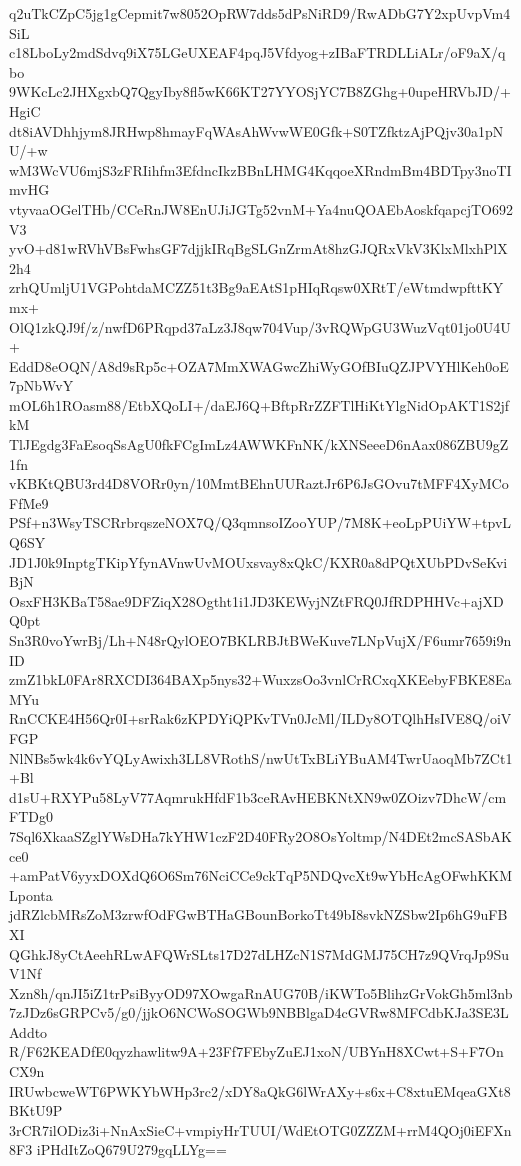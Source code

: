q2uTkCZpC5jg1gCepmit7w8052OpRW7dds5dPsNiRD9/RwADbG7Y2xpUvpVm4SiL
c18LboLy2mdSdvq9iX75LGeUXEAF4pqJ5Vfdyog+zIBaFTRDLLiALr/oF9aX/qbo
9WKcLc2JHXgxbQ7QgyIby8fl5wK66KT27YYOSjYC7B8ZGhg+0upeHRVbJD/+HgiC
dt8iAVDhhjym8JRHwp8hmayFqWAsAhWvwWE0Gfk+S0TZfktzAjPQjv30a1pNU/+w
wM3WcVU6mjS3zFRIihfm3EfdncIkzBBnLHMG4KqqoeXRndmBm4BDTpy3noTImvHG
vtyvaaOGelTHb/CCeRnJW8EnUJiJGTg52vnM+Ya4nuQOAEbAoskfqapcjTO692V3
yvO+d81wRVhVBsFwhsGF7djjkIRqBgSLGnZrmAt8hzGJQRxVkV3KlxMlxhPlX2h4
zrhQUmljU1VGPohtdaMCZZ51t3Bg9aEAtS1pHIqRqsw0XRtT/eWtmdwpfttKYmx+
OlQ1zkQJ9f/z/nwfD6PRqpd37aLz3J8qw704Vup/3vRQWpGU3WuzVqt01jo0U4U+
EddD8eOQN/A8d9sRp5c+OZA7MmXWAGwcZhiWyGOfBIuQZJPVYHlKeh0oE7pNbWvY
mOL6h1ROasm88/EtbXQoLI+/daEJ6Q+BftpRrZZFTlHiKtYlgNidOpAKT1S2jfkM
TlJEgdg3FaEsoqSsAgU0fkFCgImLz4AWWKFnNK/kXNSeeeD6nAax086ZBU9gZ1fn
vKBKtQBU3rd4D8VORr0yn/10MmtBEhnUURaztJr6P6JsGOvu7tMFF4XyMCoFfMe9
PSf+n3WsyTSCRrbrqszeNOX7Q/Q3qmnsoIZooYUP/7M8K+eoLpPUiYW+tpvLQ6SY
JD1J0k9InptgTKipYfynAVnwUvMOUxsvay8xQkC/KXR0a8dPQtXUbPDvSeKviBjN
OsxFH3KBaT58ae9DFZiqX28Ogtht1i1JD3KEWyjNZtFRQ0JfRDPHHVc+ajXDQ0pt
Sn3R0voYwrBj/Lh+N48rQylOEO7BKLRBJtBWeKuve7LNpVujX/F6umr7659i9nID
zmZ1bkL0FAr8RXCDI364BAXp5nys32+WuxzsOo3vnlCrRCxqXKEebyFBKE8EaMYu
RnCCKE4H56Qr0I+srRak6zKPDYiQPKvTVn0JcMl/ILDy8OTQlhHsIVE8Q/oiVFGP
NlNBs5wk4k6vYQLyAwixh3LL8VRothS/nwUtTxBLiYBuAM4TwrUaoqMb7ZCt1+Bl
d1sU+RXYPu58LyV77AqmrukHfdF1b3ceRAvHEBKNtXN9w0ZOizv7DhcW/cmFTDg0
7Sql6XkaaSZglYWsDHa7kYHW1czF2D40FRy2O8OsYoltmp/N4DEt2mcSASbAKce0
+amPatV6yyxDOXdQ6O6Sm76NciCCe9ckTqP5NDQvcXt9wYbHcAgOFwhKKMLponta
jdRZlcbMRsZoM3zrwfOdFGwBTHaGBounBorkoTt49bI8svkNZSbw2Ip6hG9uFBXI
QGhkJ8yCtAeehRLwAFQWrSLts17D27dLHZcN1S7MdGMJ75CH7z9QVrqJp9SuV1Nf
Xzn8h/qnJI5iZ1trPsiByyOD97XOwgaRnAUG70B/iKWTo5BlihzGrVokGh5ml3nb
7zJDz6sGRPCv5/g0/jjkO6NCWoSOGWb9NBBlgaD4cGVRw8MFCdbKJa3SE3LAddto
R/F62KEADfE0qyzhawlitw9A+23Ff7FEbyZuEJ1xoN/UBYnH8XCwt+S+F7OnCX9n
IRUwbcweWT6PWKYbWHp3rc2/xDY8aQkG6lWrAXy+s6x+C8xtuEMqeaGXt8BKtU9P
3rCR7ilODiz3i+NnAxSieC+vmpiyHrTUUI/WdEtOTG0ZZZM+rrM4QOj0iEFXn8F3
iPHdItZoQ679U279gqLLYg==
